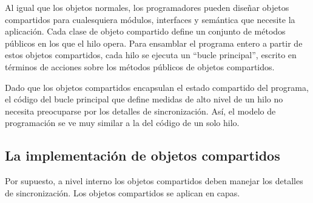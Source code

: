 \documentclass[10pt]{book}
\begin{document}
Al igual que los objetos normales, los programadores pueden diseñar objetos compartidos para cualesquiera módulos, interfaces y semántica que necesite la aplicación. Cada clase de objeto compartido define un conjunto de métodos públicos en los que el hilo opera. Para ensamblar el programa entero a partir de estos objetos compartidos, cada hilo se ejecuta un ``bucle principal'', escrito en términos de acciones sobre los métodos públicos de objetos compartidos.

Dado que los objetos compartidos encapsulan el estado compartido del programa, el código del bucle principal que define medidas de alto nivel de un hilo no necesita preocuparse por los detalles de sincronización. Así, el modelo de programación se ve muy similar a la del código de un solo hilo.

\subsection{La implementación de objetos compartidos}
Por supuesto, a nivel interno los objetos compartidos deben manejar los detalles de sincronización. Los objetos compartidos se aplican en capas.
\end{document}
